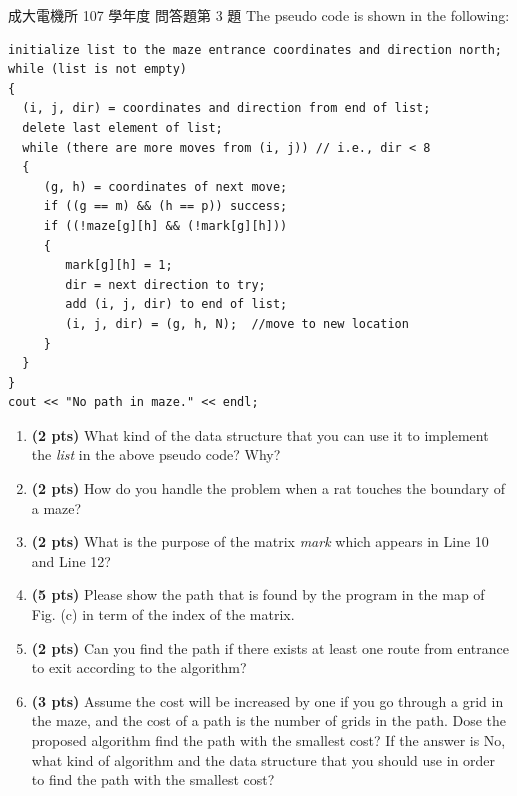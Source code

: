 \begin{pastexam}[label={px:ncku-107-ee-ds-07}]{成大電機所 107 學年度 問答題第 3 題}
The pseudo code is shown in the following:
\begin{verbatim}
initialize list to the maze entrance coordinates and direction north;
while (list is not empty)
{
  (i, j, dir) = coordinates and direction from end of list;
  delete last element of list;
  while (there are more moves from (i, j)) // i.e., dir < 8
  {
     (g, h) = coordinates of next move;
     if ((g == m) && (h == p)) success;
     if ((!maze[g][h] && (!mark[g][h]))
     {
        mark[g][h] = 1;
        dir = next direction to try;
        add (i, j, dir) to end of list;
        (i, j, dir) = (g, h, N);  //move to new location
     }
  }
}
cout << "No path in maze." << endl;
\end{verbatim}
\begin{enumerate}[label=\alph*.]
\item \textbf{(2 pts)} What kind of the data structure that you can use it to implement the
\textit{list} in the above pseudo code? Why?
\item \textbf{(2 pts)} How do you handle the problem when a rat touches the boundary of a maze?
\item \textbf{(2 pts)} What is the purpose of the matrix \textit{mark} which appears in Line 10 and Line
12?
\item \textbf{(5 pts)} Please show the path that is found by the program in the map of Fig. (c) in term
of the index of the matrix.
\item \textbf{(2 pts)} Can you find the path if there exists at least one route from entrance to exit
according to the algorithm?
\item \textbf{(3 pts)} Assume the cost will be increased by one if you go through a grid in the maze,
and the cost of a path is the number of grids in the path. Dose the proposed algorithm find the path
with the smallest cost? If the answer is No, what kind of algorithm and the data structure that you
should use in order to find the path with the smallest cost?
\end{enumerate}
\end{pastexam}

